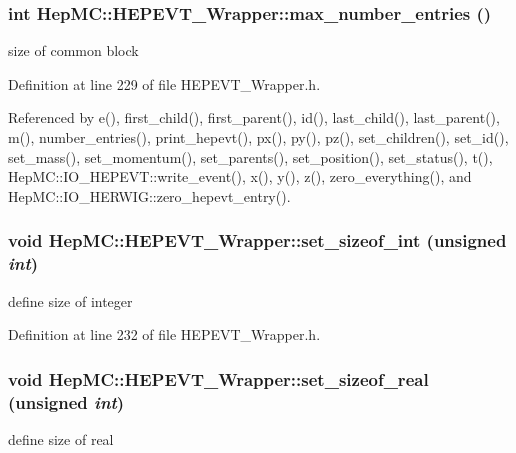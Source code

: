 \subsubsection{\setlength{\rightskip}{0pt plus 5cm}int Hep\-MC::HEPEVT\_\-Wrapper::max\_\-number\_\-entries ()\hspace{0.3cm}{\tt  [inline, static]}}\label{classHepMC_1_1HEPEVT__Wrapper_f25cc70d326c53d40560b8f9d29c3a83}


size of common block 



Definition at line 229 of file HEPEVT\_\-Wrapper.h.

Referenced by e(), first\_\-child(), first\_\-parent(), id(), last\_\-child(), last\_\-parent(), m(), number\_\-entries(), print\_\-hepevt(), px(), py(), pz(), set\_\-children(), set\_\-id(), set\_\-mass(), set\_\-momentum(), set\_\-parents(), set\_\-position(), set\_\-status(), t(), Hep\-MC::IO\_\-HEPEVT::write\_\-event(), x(), y(), z(), zero\_\-everything(), and Hep\-MC::IO\_\-HERWIG::zero\_\-hepevt\_\-entry().
\subsubsection{\setlength{\rightskip}{0pt plus 5cm}void Hep\-MC::HEPEVT\_\-Wrapper::set\_\-sizeof\_\-int (unsigned {\em int})\hspace{0.3cm}{\tt  [inline, static]}}\label{classHepMC_1_1HEPEVT__Wrapper_064e4dd97e0a0486296c2ef746812b95}


define size of integer 



Definition at line 232 of file HEPEVT\_\-Wrapper.h.
\subsubsection{\setlength{\rightskip}{0pt plus 5cm}void Hep\-MC::HEPEVT\_\-Wrapper::set\_\-sizeof\_\-real (unsigned {\em int})\hspace{0.3cm}{\tt  [inline, static]}}\label{classHepMC_1_1HEPEVT__Wrapper_20b52ae808d76d852c3365c03ca36c5c}


define size of real 

